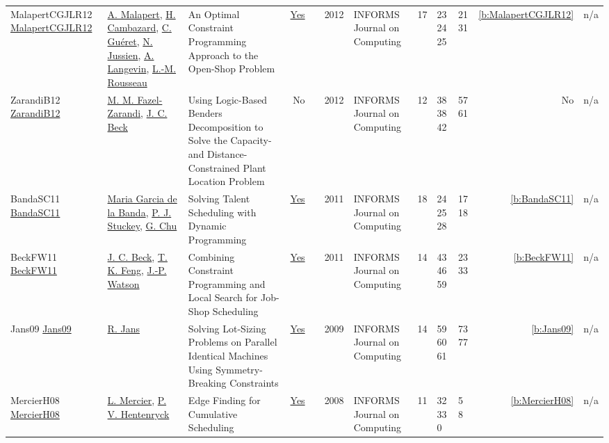 {\begin{longtable}{>{\raggedright\arraybackslash}p{3cm}>{\raggedright\arraybackslash}p{4.5cm}>{\raggedright\arraybackslash}p{6.0cm}rrrp{2.5cm}rp{1cm}p{1cm}rr}
MalapertCGJLR12 \href{https://doi.org/10.1287/ijoc.1100.0446}{MalapertCGJLR12} & \hyperref[auth:a82]{A. Malapert}, \hyperref[auth:a999]{H. Cambazard}, \hyperref[auth:a293]{C. Gu{\'{e}}ret}, \hyperref[auth:a247]{N. Jussien}, \hyperref[auth:a645]{A. Langevin}, \hyperref[auth:a326]{L.-M. Rousseau} & \cellcolor{green!10}An Optimal Constraint Programming Approach to the Open-Shop Problem & \href{../works/MalapertCGJLR12.pdf}{Yes} & \cite{MalapertCGJLR12} & 2012 & \cellcolor{red!20}INFORMS Journal on Computing & 17 & 23 24 25 & 21 31 & \ref{b:MalapertCGJLR12} & n/a\\
ZarandiB12 \href{http://dx.doi.org/10.1287/ijoc.1110.0458}{ZarandiB12} & \hyperref[auth:a946]{M. M. Fazel-Zarandi}, \hyperref[auth:a89]{J. C. Beck} & Using Logic-Based Benders Decomposition to Solve the Capacity- and Distance-Constrained Plant Location Problem & No & \cite{ZarandiB12} & 2012 & \cellcolor{red!20}INFORMS Journal on Computing & 12 & 38 38 42 & 57 61 & No & n/a\\
BandaSC11 \href{https://doi.org/10.1287/ijoc.1090.0378}{BandaSC11} & \hyperref[auth:a796]{Maria Garcia de la Banda}, \hyperref[auth:a125]{P. J. Stuckey}, \hyperref[auth:a343]{G. Chu} & Solving Talent Scheduling with Dynamic Programming & \href{../works/BandaSC11.pdf}{Yes} & \cite{BandaSC11} & 2011 & \cellcolor{red!20}INFORMS Journal on Computing & 18 & 24 25 28 & 17 18 & \ref{b:BandaSC11} & n/a\\
BeckFW11 \href{https://doi.org/10.1287/ijoc.1100.0388}{BeckFW11} & \hyperref[auth:a89]{J. C. Beck}, \hyperref[auth:a822]{T. K. Feng}, \hyperref[auth:a360]{J.-P. Watson} & Combining Constraint Programming and Local Search for Job-Shop Scheduling & \href{../works/BeckFW11.pdf}{Yes} & \cite{BeckFW11} & 2011 & \cellcolor{red!20}INFORMS Journal on Computing & 14 & 43 46 59 & 23 33 & \ref{b:BeckFW11} & n/a\\
Jans09 \href{http://dx.doi.org/10.1287/ijoc.1080.0283}{Jans09} & \hyperref[auth:a841]{R. Jans} & \cellcolor{green!10}Solving Lot-Sizing Problems on Parallel Identical Machines Using Symmetry-Breaking Constraints & \href{../works/Jans09.pdf}{Yes} & \cite{Jans09} & 2009 & \cellcolor{red!20}INFORMS Journal on Computing & 14 & 59 60 61 & 73 77 & \ref{b:Jans09} & n/a\\
MercierH08 \href{http://dx.doi.org/10.1287/ijoc.1070.0226}{MercierH08} & \hyperref[auth:a851]{L. Mercier}, \hyperref[auth:a148]{P. V. Hentenryck} & Edge Finding for Cumulative Scheduling & \href{../works/MercierH08.pdf}{Yes} & \cite{MercierH08} & 2008 & \cellcolor{red!20}INFORMS Journal on Computing & 11 & 32 33 0 & 5 8 & \ref{b:MercierH08} & n/a\\

\end{longtable}}
